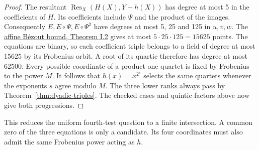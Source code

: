 \documentclass[11pt]{article}
\begin{document}
\begin{proof}
The resultant \(\operatorname{Res}_X(H(X),Y+h(X))\) has degree at
most 5 in the coefficients of \(H\). Its coefficients include \(\Psi\)
and the product of the images. Consequently \(E,E\circ\Psi,E\circ\Psi^2\)
have degrees at most 5, 25 and 125 in \(u,v,w\).
The \href{https://pinakimondal.org/books/p1_to_16.pdf}{affine Bézout bound,
Theorem I.2} gives at most \(5\cdot25\cdot125=15625\) points.
The equations are binary, so each coefficient triple belongs to a field of
degree at most 15625 by its Frobenius orbit. A root of its quartic
therefore has degree at most 62500. Every possible coordinate of a
product-one quartet is fixed by Frobenius to the power \(M\).
It follows that \(h(x)=x^{2^s}\) selects the same quartets whenever
the exponents \(s\) agree modulo \(M\).
The three lower ranks always pass by Theorem~\ref{thm:dyadic-triples}.
The checked cases and quintic factors above now give both progressions.
\end{proof}
This reduces the uniform fourth-test question to a finite intersection.
A common zero of the three equations is only a candidate. Its four
coordinates must also admit the same Frobenius power acting as \(h\).
\end{document}
